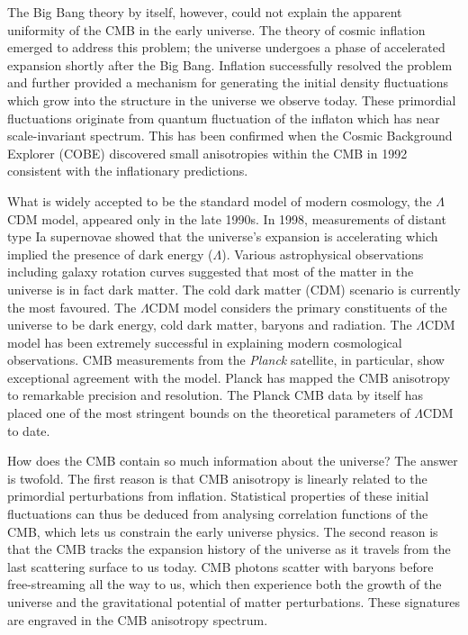 The Big Bang theory by itself, however, could not explain the apparent uniformity of the CMB in the early universe. The theory of cosmic inflation emerged to address this problem; the universe undergoes a phase of accelerated expansion shortly after the Big Bang. Inflation successfully resolved the problem and further provided a mechanism for generating the initial density fluctuations which grow into the structure in the universe we observe today. These primordial fluctuations originate from quantum fluctuation of the inflaton which has near scale-invariant spectrum. This has been confirmed when the Cosmic Background Explorer (COBE) discovered small anisotropies within the CMB in 1992 consistent with the inflationary predictions.

What is widely accepted to be the standard model of modern cosmology, the $\Lambda$CDM model, appeared only in the late 1990s. In 1998, measurements of distant type Ia supernovae showed that the universe's expansion is accelerating which implied the presence of dark energy ($\Lambda$). Various astrophysical observations including galaxy rotation curves suggested that most of the matter in the universe is in fact dark matter. The cold dark matter (CDM) scenario is currently the most favoured. The $\Lambda$CDM model considers the primary constituents of the universe to be dark energy, cold dark matter, baryons and radiation. The $\Lambda$CDM model has been extremely successful in explaining modern cosmological observations. CMB measurements from the \textit{Planck} satellite, in particular, show exceptional agreement with the model. Planck has mapped the CMB anisotropy to remarkable precision and resolution. The Planck CMB data by itself has placed one of the most stringent bounds on the theoretical parameters of $\Lambda$CDM to date.

How does the CMB contain so much information about the universe? The answer is twofold. The first reason is that CMB anisotropy is linearly related to the primordial perturbations from inflation. Statistical properties of these initial fluctuations can thus be deduced from analysing correlation functions of the CMB, which lets us constrain the early universe physics. The second reason is that the CMB tracks the expansion history of the universe as it travels from the last scattering surface to us today. CMB photons scatter with baryons before free-streaming all the way to us, which then experience both the growth of the universe and the gravitational potential of matter perturbations. These signatures are engraved in the CMB anisotropy spectrum.

